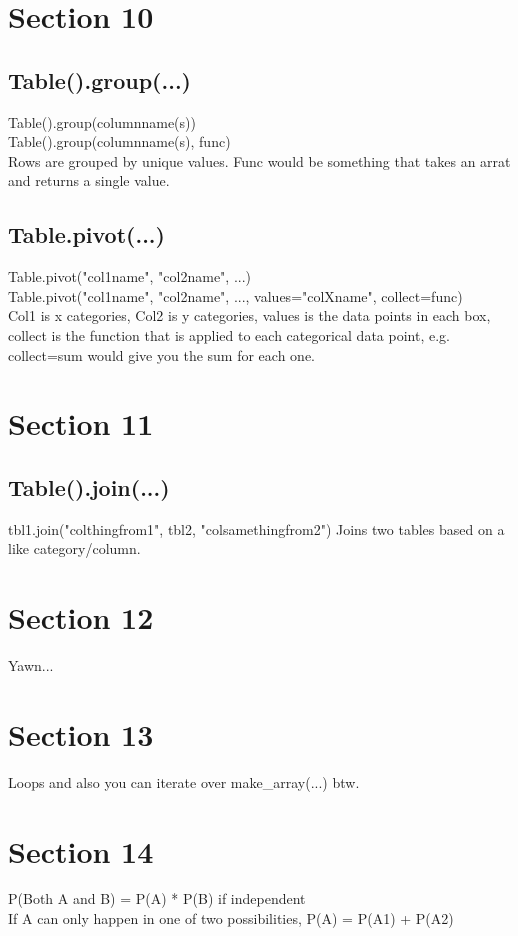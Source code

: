 \documentclass[10pt, a4paper, twocolumn]{article}
\begin{document}
    \section{Section 10}
    \subsection{Table().group(...)}
    Table().group(columnname(s))\\
    Table().group(columnname(s), func)\\
    Rows are grouped by unique values. Func would be something that takes an arrat and returns a single value.
    \subsection{Table.pivot(...)}
    Table.pivot("col1name", "col2name", ...)\\
    Table.pivot("col1name", "col2name", ..., values="colXname", collect=func)\\
    Col1 is x categories, Col2 is y categories, values is the data points in each box, collect is the function that is applied to each categorical data point, e.g. collect=sum would give you the sum for each one.

    \section{Section 11}
    \subsection{Table().join(...)}
    tbl1.join("colthingfrom1", tbl2, "colsamethingfrom2")
    Joins two tables based on a like category/column.

    \section{Section 12}
    Yawn...\\

    \section{Section 13}
    Loops and also you can iterate over make\_array(...) btw.\\

    \section{Section 14}
    P(Both A and B) = P(A) * P(B) if independent\\
    If A can only happen in one of two possibilities, P(A) = P(A1) + P(A2)\\
\end{document}
